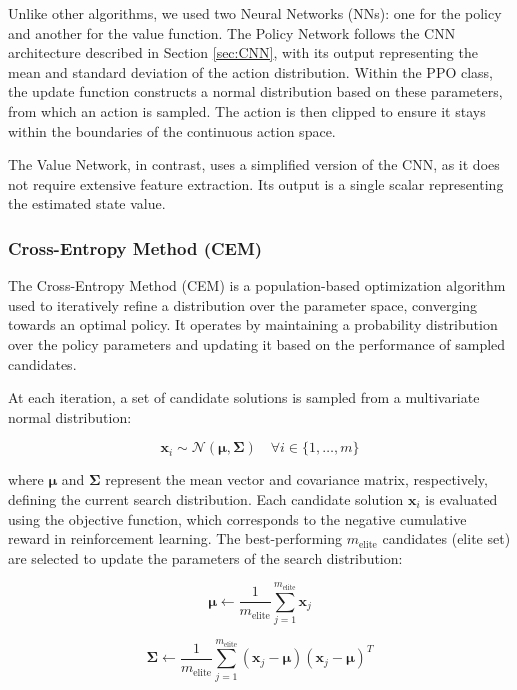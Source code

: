 \documentclass[../CSC_52081_EP.tex]{subfiles}
\begin{document}
Unlike other algorithms, we used two Neural Networks (NNs): one for the policy and another for the value function. The Policy Network follows the CNN architecture described in Section \ref{sec:CNN}, with its output representing the mean and standard deviation of the action distribution. Within the PPO class, the update function constructs a normal distribution based on these parameters, from which an action is sampled. The action is then clipped to ensure it stays within the boundaries of the continuous action space.

The Value Network, in contrast, uses a simplified version of the CNN, as it does not require extensive feature extraction. Its output is a single scalar representing the estimated state value.
\hspace{1cm}
\subsubsection{Cross-Entropy Method (CEM)}

The Cross-Entropy Method (CEM) is a population-based optimization algorithm used to iteratively refine a distribution over the parameter space, converging towards an optimal policy. It operates by maintaining a probability distribution over the policy parameters and updating it based on the performance of sampled candidates.

At each iteration, a set of candidate solutions is sampled from a multivariate normal distribution:

\begin{equation}
\boldsymbol{x}_i \sim \mathcal{N}(\boldsymbol{\mu}, \boldsymbol{\Sigma}) \quad \forall i \in \{1, \dots, m\}
\end{equation}

where $\boldsymbol{\mu}$ and $\boldsymbol{\Sigma}$ represent the mean vector and covariance matrix, respectively, defining the current search distribution. Each candidate solution $\boldsymbol{x}_i$ is evaluated using the objective function, which corresponds to the negative cumulative reward in reinforcement learning. The best-performing $m_{\text{elite}}$ candidates (elite set) are selected to update the parameters of the search distribution:

\begin{equation}
\boldsymbol{\mu} \leftarrow \frac{1}{m_{\text{elite}}} \sum_{j=1}^{m_{\text{elite}}} \boldsymbol{x}_j
\end{equation}

\begin{equation}
\boldsymbol{\Sigma} \leftarrow \frac{1}{m_{\text{elite}}} \sum_{j=1}^{m_{\text{elite}}} (\boldsymbol{x}_j - \boldsymbol{\mu}) (\boldsymbol{x}_j - \boldsymbol{\mu})^T
\end{equation}
\end{document}
